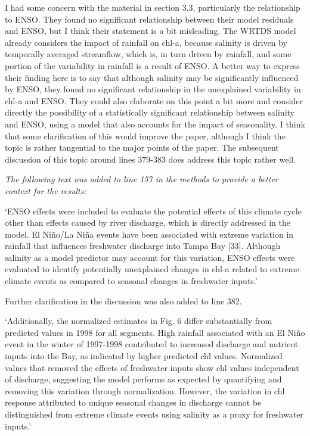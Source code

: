 \documentclass[letterpaper,12pt,oneside]{article}\usepackage[]{graphicx}\usepackage[]{color}
\begin{document}
I had some concern with the material in section 3.3, particularly the relationship to ENSO.  They found no significant relationship between their model residuals and ENSO, but I think their statement is a bit misleading.  The WRTDS model already considers the impact of rainfall on chl-a, because salinity is driven by temporally averaged streamflow, which is, in turn driven by rainfall, and some portion of the variability in rainfall is a result of ENSO.  A better way to express their finding here is to say that although salinity may be significantly influenced by ENSO, they found no significant relationship in the unexplained variability in chl-a and ENSO.  They could also elaborate on this point a bit more and consider directly the possibility of a statistically significant relationship between salinity and ENSO, using a model that also accounts for the impact of seasonality.  I think that some clarification of this would improve the paper, although I think the topic is rather tangential to the major points of the paper.  The subsequent discussion of this topic around lines 379-383 does address this topic rather well.

{\it The following text was added to line 157 in the methods to provide a better context for the results:

`ENSO effects were included to evaluate the potential effects of this climate cycle other than effects caused by river discharge, which is directly addressed in the model.  El Ni\~{n}o/La Ni\~{n}a events have been associated with extreme variation in rainfall that influences freshwater discharge into Tampa Bay [33].  Although salinity as a model predictor may account for this variation, ENSO effects were evaluated to identify potentially unexplained changes in chl-a related to extreme climate events as compared to seasonal changes in freshwater inputs.'

Further clarification in the discussion was also added to line 382.

`Additionally, the normalized  estimates in Fig. 6 differ substantially from predicted values in 1998 for all segments.  High rainfall associated with an El Ni\~{n}o event in the winter of 1997-1998 contributed to increased discharge and nutrient inputs into the Bay, as indicated by higher predicted \ac{chl} values.  Normalized values that removed the effects of freshwater inputs show \ac{chl} values independent of discharge, suggesting the model performs as expected by quantifying and removing this variation through normalization.  However, the variation in \ac{chl} response attributed to unique seasonal changes in discharge cannot be distinguished from extreme climate events using salinity as a proxy for freshwater inputs.'
}
\end{document}

